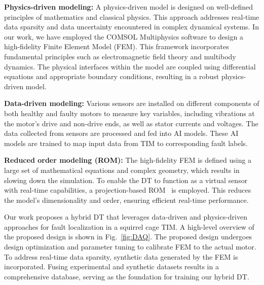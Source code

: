 \documentclass[a4paper,conference]{IEEEtran}
\begin{document}
\textbf{Physics-driven modeling:} A physics-driven model is designed on well-defined principles of mathematics and classical physics. This approach addresses real-time data sparsity and data uncertainty encountered in complex dynamical systems. In our work, we have employed the COMSOL Multiphysics software to design a high-fidelity Finite Element Model (FEM). This framework incorporates fundamental principles such as electromagnetic field theory and multibody dynamics. The physical interfaces within the model are coupled using differential equations and appropriate boundary conditions, resulting in a robust physics-driven model.


\textbf{Data-driven modeling:} Various sensors are installed on different components of both healthy and faulty motors to measure key variables, including vibrations at the motor's drive and non-drive ends, as well as stator currents and voltages. The data collected from sensors are processed and fed into AI models. These AI models are trained to map input data from TIM to corresponding fault labels.


\textbf{Reduced order modeling (ROM):} The high-fidelity FEM is defined using a large set of mathematical equations and complex geometry, which results in slowing down the simulation. To enable the DT to function as a virtual sensor with real-time capabilities, a projection-based ROM~\cite{9982890} is employed. This reduces the model's dimensionality and order, ensuring efficient real-time performance. 

Our work proposes a hybrid DT that leverages data-driven and physics-driven approaches for fault localization in a squirrel cage TIM. A high-level overview of the proposed design is shown in Fig.~\ref{fig:DAQ}. The proposed design undergoes design optimization and parameter tuning to calibrate FEM to the actual motor. To address real-time data sparsity, synthetic data generated by the FEM is incorporated. Fusing experimental and synthetic datasets results in a comprehensive database, serving as the foundation for training our hybrid DT.
\end{document}
